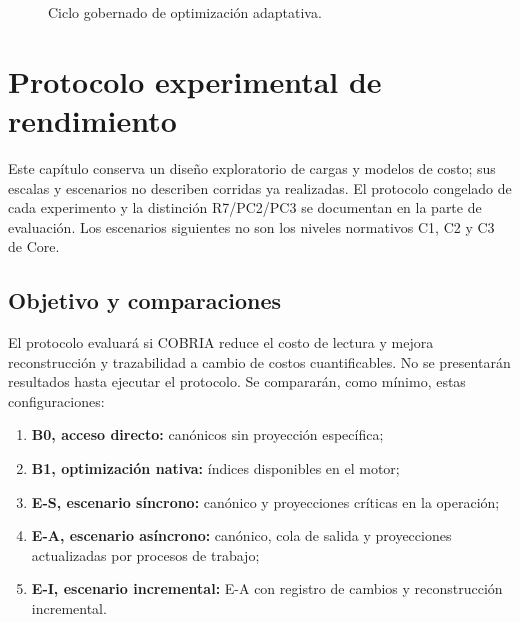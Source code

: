 \begin{figure}[H]
\centering
{}
\caption{Ciclo gobernado de optimización adaptativa.}
\label{fig:ciclo-optimizacion}
\end{figure}

\chapter{Protocolo experimental de rendimiento}

Este capítulo conserva un diseño exploratorio de cargas y modelos de costo; sus
escalas y escenarios no describen corridas ya realizadas. El protocolo congelado de
cada experimento y la distinción R7/PC2/PC3 se documentan en la parte de evaluación.
Los escenarios siguientes no son los niveles normativos C1, C2 y C3 de Core.

\section{Objetivo y comparaciones}

El protocolo evaluará si COBRIA reduce el costo de lectura y mejora reconstrucción y
trazabilidad a cambio de costos cuantificables. No se presentarán resultados hasta
ejecutar el protocolo. Se compararán, como mínimo, estas configuraciones:

\begin{enumerate}[leftmargin=*]
  \item \textbf{B0, acceso directo:} canónicos sin proyección específica;
  \item \textbf{B1, optimización nativa:} índices disponibles en el motor;
  \item \textbf{E-S, escenario síncrono:} canónico y proyecciones críticas en la operación;
  \item \textbf{E-A, escenario asíncrono:} canónico, cola de salida y proyecciones actualizadas por
  procesos de trabajo;
  \item \textbf{E-I, escenario incremental:} E-A con registro de cambios y reconstrucción
  incremental.
\end{enumerate}

